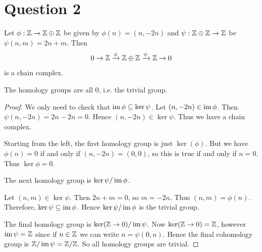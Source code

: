 \documentclass{unswmaths}
\begin{document}
\section*{Question 2}
\begin{proposition}
    Let $\phi:\mathbb{Z}\rightarrow\mathbb{Z}\oplus\mathbb{Z}$ be given by $\phi(n) = (n,-2n)$
    and $\psi:\mathbb{Z}\oplus\mathbb{Z}\rightarrow \mathbb{Z}$ be $\psi(n,m) = 2n+m$. Then
    \begin{equation*}
        0\xrightarrow{}\mathbb{Z}\xrightarrow{\phi}\mathbb{Z}\oplus\mathbb{Z}\xrightarrow{\psi}\mathbb{Z}\xrightarrow{} 0
    \end{equation*}
    is a chain complex. 
    
    The homology groups are all $0$, i.e. the trivial group.
\end{proposition}
\begin{proof}
    We only need to check that $\operatorname{im}\phi \subseteq \ker\psi$. Let $(n,-2n) \in \operatorname{im}\phi$.
    Then $\psi(n,-2n) = 2n-2n = 0$. Hence $(n,-2n) \in \ker\psi$. Thus we
    have a chain complex.
    
    Starting from the left, the first homology group is just $\ker(\phi)$.
    But we have $\phi(n) = 0$ if and only if $(n,-2n) = (0,0)$,
    so this is true if and only if $n = 0$. Thus $\ker\phi = 0$. 
    
    The next homology group is $\ker\psi/\operatorname{im}\phi$.
    
    Let $(n,m) \in \ker\psi$. Then $2n+m = 0$, so $m = -2n$.
    Thus $(n,m) = \phi(n)$. Therefore, $\ker\psi \subseteq \operatorname{im}\phi$.
    Hence $\ker\psi/\operatorname{im}\phi$ is the trivial group.
    
    The final homology group is $\ker(\mathbb{Z}\rightarrow 0)/\operatorname{im}\psi$.
    Now $\ker(\mathbb{Z}\rightarrow 0) = \mathbb{Z}$, however $\operatorname{im}\psi = \mathbb{Z}$
    since if $n \in \mathbb{Z}$ we can write $n = \psi(0,n)$. Hence
    the final cohomology group is $\mathbb{Z}/\operatorname{im}\psi = \mathbb{Z}/\mathbb{Z}$. So all
    homology groups are trivial.
\end{proof}
\end{document}
